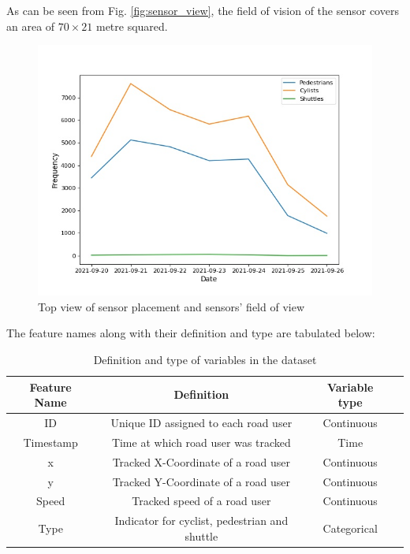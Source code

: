 \documentclass{article}
\begin{document}
As can be seen from Fig. \ref{fig:sensor_view}, the field of vision of the sensor covers an area of $70 \times 21$ metre squared. 

\begin{figure}[H]
\centering
\includegraphics[scale=0.3]{data/Data_6.jpg}
\caption{Top view of sensor placement and sensors' field of view}
\end{figure}



The feature names along with their definition and type are tabulated below:
\begin{table}[H]
\begin{center}
\begin{tabular}{ cccc } 
\hline
Feature Name & Definition & Variable type\\
\hline
ID & Unique ID assigned to each road user & Continuous\\ 
Timestamp & Time at which road user was tracked & Time\\ 
x & Tracked X-Coordinate of a road user & Continuous\\
y & Tracked Y-Coordinate of a road user & Continuous \\
Speed & Tracked speed of a road user&Continuous \\
Type & Indicator for cyclist, pedestrian and shuttle & Categorical\\
\hline
\end{tabular}
\caption{\label{tab:features}Definition and type of variables in the dataset}
\end{center}
\end{table}
\end{document}
